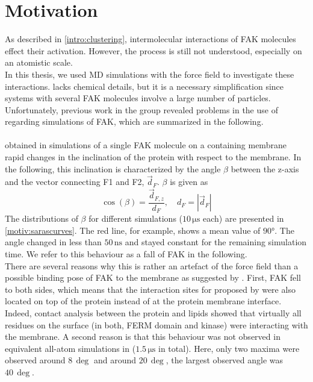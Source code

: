 \chapter{Motivation}
\label{motivation}
As described in \autoref{intro:clustering}, intermolecular interactions of FAK molecules effect their activation. However, the process is still not understood, especially on an atomistic scale.\\
In this thesis, we used MD simulations with the \martini{} force field to investigate these interactions. \martini{} lacks chemical details, but it is a necessary simplification since systems with several FAK molecules involve a large number of particles. Unfortunately, previous work in the group \autocite{sara} revealed problems in the use of \martini{} regarding simulations of FAK, which are summarized in the following.\\
\\
\textcite{sara} obtained in simulations of a single FAK molecule on a \pip{} containing membrane rapid changes in the inclination of the protein with respect to the membrane. In the following, this inclination is characterized by the angle $\beta$ between the z-axis and the vector connecting F1 and F2, $\vec{d}_F$. $\beta$ is given as
\begin{equation}
\cos\left(\beta\right) = \frac{\vec{d}_{F, z}}{d_F},\quad d_F = \left|\vec{d}_F\right|
\end{equation}
The distributions of $\beta$ for different simulations ($10\,\si{\micro\second}$ each) are presented in \autoref{motiv:sarascurves}. The red line, for example, shows a mean value of $90°$. The angle changed in less than $50\,\si{\nano\second}$ and stayed constant for the remaining simulation time. We refer to this behaviour as a fall of FAK in the following.\\
There are several reasons why this is rather an artefact of the \martini{} force field than a possible binding pose of FAK to the membrane as suggested by \textcite{pap002}. First, FAK fell to both sides, which means that the interaction sites for \pip{} proposed by \textcite{pap002} were also located on top of the protein instead of at the protein membrane interface. Indeed, contact analysis between the protein and \pip{} lipids showed that virtually all residues on the surface (in both, FERM domain and kinase) were interacting with the membrane. A second reason is that this behaviour was not observed in equivalent all-atom simulations in \charmm{} ($1.5\,\si{\micro\second}$ in total). Here, only two maxima were observed around $8\,\si{\deg}$ and around $20\,\si{\deg}$, the largest observed angle was $40\,\si{\deg}$.\\
